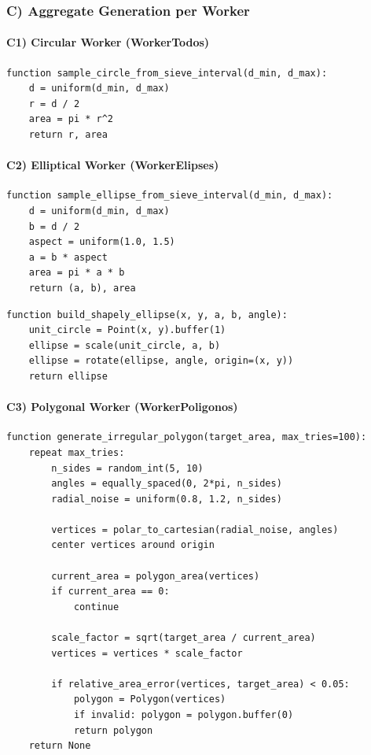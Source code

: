 ﻿\documentclass[11pt,a4paper]{article}
\begin{document}
\subsubsection*{C) Aggregate Generation per Worker}

\paragraph{C1) Circular Worker (WorkerTodos)}

\begin{lstlisting}[style=pseudo]
function sample_circle_from_sieve_interval(d_min, d_max):
	d = uniform(d_min, d_max)
	r = d / 2
	area = pi * r^2
	return r, area
\end{lstlisting}


\paragraph{C2) Elliptical Worker (WorkerElipses)}

\begin{lstlisting}[style=pseudo]
function sample_ellipse_from_sieve_interval(d_min, d_max):
	d = uniform(d_min, d_max)
	b = d / 2
	aspect = uniform(1.0, 1.5)
	a = b * aspect
	area = pi * a * b
	return (a, b), area
\end{lstlisting}


\begin{lstlisting}[style=pseudo]
function build_shapely_ellipse(x, y, a, b, angle):
	unit_circle = Point(x, y).buffer(1)
	ellipse = scale(unit_circle, a, b)
	ellipse = rotate(ellipse, angle, origin=(x, y))
	return ellipse
\end{lstlisting}


\paragraph{C3) Polygonal Worker (WorkerPoligonos)}

\begin{lstlisting}[style=pseudo]
function generate_irregular_polygon(target_area, max_tries=100):
	repeat max_tries:
		n_sides = random_int(5, 10)
		angles = equally_spaced(0, 2*pi, n_sides)
		radial_noise = uniform(0.8, 1.2, n_sides)

		vertices = polar_to_cartesian(radial_noise, angles)
		center vertices around origin

		current_area = polygon_area(vertices)
		if current_area == 0:
			continue

		scale_factor = sqrt(target_area / current_area)
		vertices = vertices * scale_factor

		if relative_area_error(vertices, target_area) < 0.05:
			polygon = Polygon(vertices)
			if invalid: polygon = polygon.buffer(0)
			return polygon
	return None
\end{lstlisting}
\end{document}
